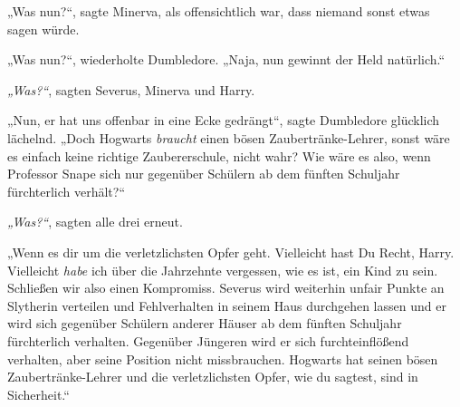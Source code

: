 „Was nun?“, sagte Minerva, als offensichtlich war, dass niemand sonst etwas sagen würde. 

„Was nun?“, wiederholte Dumbledore. „Naja, nun gewinnt der Held natürlich.“ 

\emph{„Was?“}, sagten Severus, Minerva und Harry. 

„Nun, er hat uns offenbar in eine Ecke gedrängt“, sagte Dumbledore glücklich lächelnd. „Doch Hogwarts \emph{braucht} einen bösen Zaubertränke-Lehrer, sonst wäre es einfach keine richtige Zaubererschule, nicht wahr? Wie wäre es also, wenn Professor Snape sich nur gegenüber Schülern ab dem fünften Schuljahr fürchterlich verhält?“ 

\emph{„Was?“}, sagten alle drei erneut. 

„Wenn es dir um die verletzlichsten Opfer geht. Vielleicht hast Du Recht, Harry. Vielleicht \emph{habe} ich über die Jahrzehnte vergessen, wie es ist, ein Kind zu sein. Schließen wir also einen Kompromiss. Severus wird weiterhin unfair Punkte an Slytherin verteilen und Fehlverhalten in seinem Haus durchgehen lassen und er wird sich gegenüber Schülern anderer Häuser ab dem fünften Schuljahr fürchterlich verhalten. Gegenüber Jüngeren wird er sich furchteinflößend verhalten, aber seine Position nicht missbrauchen. Hogwarts hat seinen bösen Zaubertränke-Lehrer und die verletzlichsten Opfer, wie du sagtest, sind in Sicherheit.“ 

